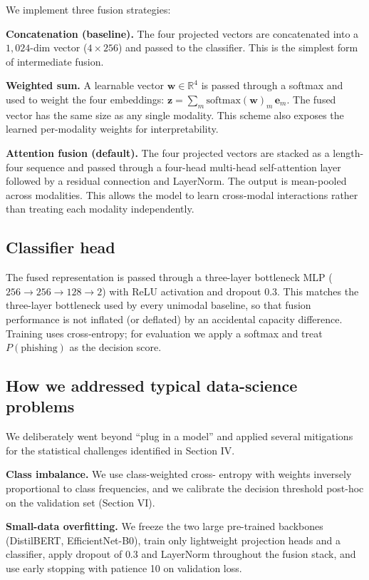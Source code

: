 \documentclass[conference]{IEEEtran}
\begin{document}
We implement three fusion strategies:

\noindent\textbf{Concatenation (baseline).} The four projected
vectors are concatenated into a $1{,}024$-dim vector ($4\times 256$)
and passed to the classifier. This is the simplest form of
intermediate fusion.

\noindent\textbf{Weighted sum.} A learnable vector
$\mathbf{w}\in\mathbb{R}^{4}$ is passed through a softmax and used
to weight the four embeddings:
$\mathbf{z}=\sum_{m}\text{softmax}(\mathbf{w})_{m}\,\mathbf{e}_{m}$.
The fused vector has the same size as any single modality. This
scheme also exposes the learned per-modality weights for
interpretability.

\noindent\textbf{Attention fusion (default).} The four projected
vectors are stacked as a length-four sequence and passed through a
four-head multi-head self-attention layer followed by a residual
connection and LayerNorm. The output is mean-pooled across
modalities. This allows the model to learn cross-modal
interactions rather than treating each modality independently.

\subsection{Classifier head}
The fused representation is passed through a three-layer bottleneck
MLP ($256\rightarrow256\rightarrow128\rightarrow2$) with ReLU
activation and dropout $0.3$. This matches the three-layer bottleneck
used by every unimodal baseline, so that fusion performance is not
inflated (or deflated) by an accidental capacity difference. Training
uses cross-entropy; for evaluation we apply a softmax and treat
$P(\text{phishing})$ as the decision score.

\subsection{How we addressed typical data-science problems}
We deliberately went beyond ``plug in a model'' and applied several
mitigations for the statistical challenges identified in Section IV.

\noindent\textbf{Class imbalance.} We use class-weighted cross-
entropy with weights inversely proportional to class frequencies,
and we calibrate the decision threshold post-hoc on the validation
set (Section VI).

\noindent\textbf{Small-data overfitting.} We freeze the two large
pre-trained backbones (DistilBERT, EfficientNet-B0), train only
lightweight projection heads and a classifier, apply dropout of
$0.3$ and LayerNorm throughout the fusion stack, and use early
stopping with patience 10 on validation loss.
\end{document}
